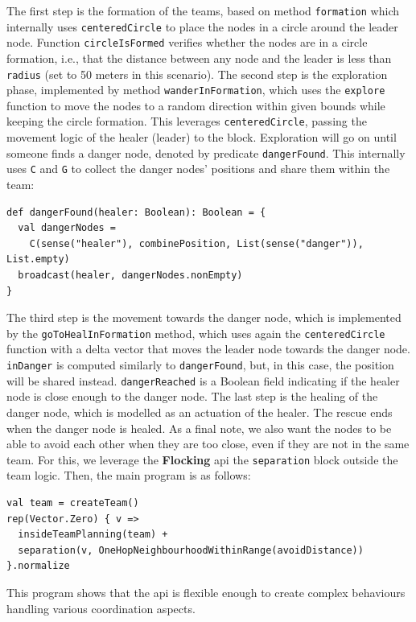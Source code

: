 The first step is the formation of the teams, 
 based on method \lstinline|formation| which
 internally uses \lstinline|centeredCircle| 
  to place the nodes in a circle around the leader node. 
 Function \lstinline|circleIsFormed| verifies whether the nodes are in a circle formation, i.e., that the distance between any node and the leader is less than \lstinline|radius| (set to 50 meters in this scenario).
%
The second step is the exploration phase, 
 implemented by method \lstinline|wanderInFormation|, 
 which uses the \lstinline|explore| function to move the nodes to a random direction
 within given bounds while keeping the circle formation.
 This leverages \lstinline|centeredCircle|,  passing 
 the movement logic of the healer (leader) to the block.
Exploration will go on until someone finds a danger node, 
 denoted by predicate \lstinline|dangerFound|.
This internally uses \lstinline|C| and \lstinline|G| to collect the danger nodes' positions
 and share them within the team:
\begin{lstlisting}
def dangerFound(healer: Boolean): Boolean = {
  val dangerNodes = 
    C(sense("healer"), combinePosition, List(sense("danger")), List.empty)
  broadcast(healer, dangerNodes.nonEmpty)
}
\end{lstlisting}
%
The third step is the movement towards the danger node, 
 which is implemented by the \lstinline|goToHealInFormation| method, 
 which uses again the \lstinline|centeredCircle| function
 with a delta vector that moves the leader node towards the danger node.
\lstinline|inDanger| is computed similarly to \lstinline|dangerFound|, 
 but, in this case, the position will be shared instead. %
 \lstinline|dangerReached| is a Boolean field indicating if the healer node is close enough to the danger node.
The last step is the healing of the danger node, which is modelled as an actuation of the healer. %
 The rescue ends when the danger node is healed.
As a final note, we also want the nodes to be able to avoid 
 each other when they are too close, even if they are not in the same team.
 For this, we leverage the \textbf{Flocking} \ac{api} the \texttt{separation} block outside the team logic.
Then, the main program is as follows:
\begin{lstlisting}
val team = createTeam()
rep(Vector.Zero) { v =>
  insideTeamPlanning(team) + 
  separation(v, OneHopNeighbourhoodWithinRange(avoidDistance))
}.normalize
\end{lstlisting}
This program shows that the \ac{api} 
 is flexible enough to create complex behaviours handling various coordination aspects.
%

